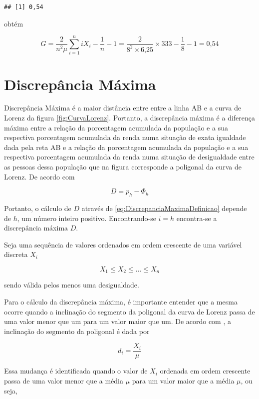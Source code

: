 \documentclass[
]{book}
\begin{document}
\begin{verbatim}
## [1] 0,54
\end{verbatim}

obtém

\[
  G = \dfrac{2}{n^2\mu}\sum_{i=1}^{n} iX_i - \dfrac{1}{n} - 1 = \dfrac{2}{\text{8}^2 \times \text{6,25}}\times \text{333} - \dfrac{1}{\text{8}} - 1 = \text{0,54}
\]

\hypertarget{discrepuxe2ncia-muxe1xima}{%
\section{Discrepância Máxima}\label{discrepuxe2ncia-muxe1xima}}

Discrepância Máxima é a maior distância entre entre a linha AB e a curva de Lorenz da figura \ref{fig:CurvaLorenz}. Portanto, a discrepância máxima é a diferença máxima entre a relação da porcentagem acumulada da população e a sua respectiva porcentagem acumulada da renda numa situação de exata igualdade dada pela reta AB e a relação da porcentagem acumulada da população e a sua respectiva porcentagem acumulada da renda numa situação de desigualdade entre as pessoas dessa população que na figura corresponde a poligonal da curva de Lorenz. De acordo com \citet{Hoffmann2006}

\[
  D = p_h - \Phi_h
  \label{eq:DiscrepanciaMaximaDefinicao}
\]

Portanto, o cálculo de \(D\) através de \eqref{eq:DiscrepanciaMaximaDefinicao} depende de \(h\), um número inteiro positivo. Encontrando-se \(i=h\) encontra-se a discrepância máxima \(D\).

Seja uma sequência de valores ordenados em ordem crescente de uma variável discreta \(X_i\)

\[
  X_1 \leq X_2 \leq \ldots \leq X_n
\]

sendo válida pelos menos uma desigualdade.

Para o cálculo da discrepância máxima, é importante entender que a mesma ocorre quando a inclinação do segmento da poligonal da curva de Lorenz passa de uma valor menor que um para um valor maior que um. De acordo com \citet{Hoffmann2006}, a inclinação do segmento da poligonal é dada por

\[
  d_i = \dfrac{X_i}{\mu}
\]

Essa mudança é identificada quando o valor de \(X_i\) ordenada em ordem crescente passa de uma valor menor que a média \(\mu\) para um valor maior que a média \(\mu\), ou seja,
\end{document}
